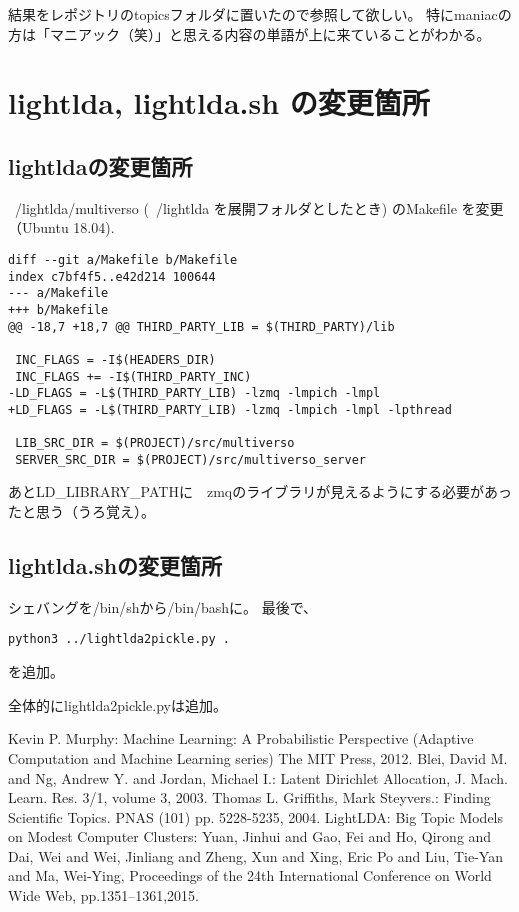 \documentclass[uplatex,dvipdfmx,fleqn]{jsarticle}
\begin{document}
結果をレポジトリのtopicsフォルダに置いたので参照して欲しい。
特にmaniacの方は「マニアック（笑）」と思える内容の単語が上に来ていることがわかる。

\section{lightlda, lightlda.sh の変更箇所}

\subsection{lightldaの変更箇所}
~/lightlda/multiverso (~/lightlda を展開フォルダとしたとき) のMakefile を変更（Ubuntu 18.04).

\begin{verbatim}
diff --git a/Makefile b/Makefile
index c7bf4f5..e42d214 100644
--- a/Makefile
+++ b/Makefile
@@ -18,7 +18,7 @@ THIRD_PARTY_LIB = $(THIRD_PARTY)/lib

 INC_FLAGS = -I$(HEADERS_DIR)
 INC_FLAGS += -I$(THIRD_PARTY_INC)
-LD_FLAGS = -L$(THIRD_PARTY_LIB) -lzmq -lmpich -lmpl
+LD_FLAGS = -L$(THIRD_PARTY_LIB) -lzmq -lmpich -lmpl -lpthread

 LIB_SRC_DIR = $(PROJECT)/src/multiverso
 SERVER_SRC_DIR = $(PROJECT)/src/multiverso_server
\end{verbatim}

あとLD\_LIBRARY\_PATHに　zmqのライブラリが見えるようにする必要があったと思う（うろ覚え）。

\subsection{lightlda.shの変更箇所}
シェバングを/bin/shから/bin/bashに。
最後で、

\begin{verbatim}
python3 ../lightlda2pickle.py .
\end{verbatim}
を追加。

全体的にlightlda2pickle.pyは追加。


\begin{thebibliography}{99}
   Kevin P. Murphy: Machine Learning: A Probabilistic Perspective (Adaptive Computation and Machine Learning series) The MIT Press, 2012.
   Blei, David M. and Ng, Andrew Y. and Jordan, Michael I.: Latent Dirichlet Allocation,
J. Mach. Learn. Res. 3/1, volume 3, 2003.
   Thomas L. Griffiths, Mark Steyvers.: Finding Scientific Topics. PNAS (101) pp. 5228-5235, 2004.
   LightLDA: Big Topic Models on Modest Computer Clusters: Yuan, Jinhui and Gao, Fei and Ho, Qirong and Dai, Wei and Wei, Jinliang and Zheng, Xun and Xing, Eric Po and Liu, Tie-Yan and Ma, Wei-Ying,
  Proceedings of the 24th International Conference on World Wide Web, pp.1351--1361,2015.
\end{thebibliography}
\end{document}
